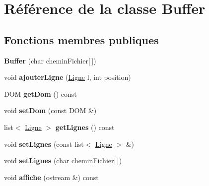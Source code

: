 \hypertarget{classBuffer}{\section{\-Référence de la classe \-Buffer}
\label{classBuffer}
}
\subsection*{\-Fonctions membres publiques}
\begin{DoxyCompactItemize}
\item 
\hypertarget{classBuffer_a968f9c9b50fe02f7d76de200f78507b0}{{\bfseries \-Buffer} (char chemin\-Fichier\mbox{[}$\,$\mbox{]})}\label{classBuffer_a968f9c9b50fe02f7d76de200f78507b0}

\item 
\hypertarget{classBuffer_aaa71afa6da49b147a7060900288e67d3}{void {\bfseries ajouter\-Ligne} (\hyperlink{classLigne}{\-Ligne} l, int position)}\label{classBuffer_aaa71afa6da49b147a7060900288e67d3}

\item 
\hypertarget{classBuffer_ae3c4df1d65179d391de936a324c48871}{\-D\-O\-M {\bfseries get\-Dom} () const }\label{classBuffer_ae3c4df1d65179d391de936a324c48871}

\item 
\hypertarget{classBuffer_ab0d9e2abf2c5a8390d567407cd1cf556}{void {\bfseries set\-Dom} (const \-D\-O\-M \&)}\label{classBuffer_ab0d9e2abf2c5a8390d567407cd1cf556}

\item 
\hypertarget{classBuffer_af7f5a6f316e5659e462874998c87921d}{list$<$ \hyperlink{classLigne}{\-Ligne} $>$ {\bfseries get\-Lignes} () const }\label{classBuffer_af7f5a6f316e5659e462874998c87921d}

\item 
\hypertarget{classBuffer_a8d4cb25f19d9782d663d73ca460e1e37}{void {\bfseries set\-Lignes} (const list$<$ \hyperlink{classLigne}{\-Ligne} $>$ \&)}\label{classBuffer_a8d4cb25f19d9782d663d73ca460e1e37}

\item 
\hypertarget{classBuffer_a122fe744cef772a83c6228195474171d}{void {\bfseries set\-Lignes} (char chemin\-Fichier\mbox{[}$\,$\mbox{]})}\label{classBuffer_a122fe744cef772a83c6228195474171d}

\item 
\hypertarget{classBuffer_a89c9eac6ff51f0e9b2e8eaddd1c56bd0}{void {\bfseries affiche} (ostream \&) const }\label{classBuffer_a89c9eac6ff51f0e9b2e8eaddd1c56bd0}


\end{DoxyCompactItemize}
